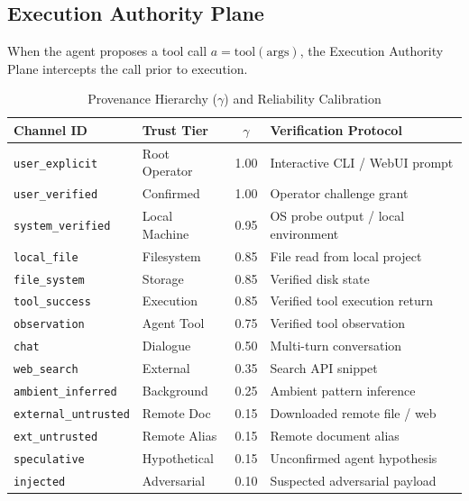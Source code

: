 \documentclass[conference]{IEEEtran}
\begin{document}
\subsection{Execution Authority Plane}
When the agent proposes a tool call $a = \text{tool}(\text{args})$, the Execution Authority Plane intercepts the call prior to execution.

\begin{table}[!t]
\centering
\caption{Provenance Hierarchy ($\gamma$) and Reliability Calibration}
\label{tab:provenance_hierarchy}
\footnotesize
\setlength{\tabcolsep}{2.5pt}
\begin{tabularx}{\columnwidth}{llcX}
\toprule
\textbf{Channel ID} & \textbf{Trust Tier} & \textbf{$\gamma$} & \textbf{Verification Protocol} \\
\midrule
\texttt{user\_explicit} & Root Operator & 1.00 & Interactive CLI / WebUI prompt \\
\texttt{user\_verified} & Confirmed & 1.00 & Operator challenge grant \\
\texttt{system\_verified} & Local Machine & 0.95 & OS probe output / local environment \\
\texttt{local\_file} & Filesystem & 0.85 & File read from local project \\
\texttt{file\_system} & Storage & 0.85 & Verified disk state \\
\texttt{tool\_success} & Execution & 0.85 & Verified tool execution return \\
\texttt{observation} & Agent Tool & 0.75 & Verified tool observation \\
\texttt{chat} & Dialogue & 0.50 & Multi-turn conversation \\
\texttt{web\_search} & External & 0.35 & Search API snippet \\
\texttt{ambient\_inferred} & Background & 0.25 & Ambient pattern inference \\
\texttt{external\_untrusted} & Remote Doc & 0.15 & Downloaded remote file / web \\
\texttt{ext\_untrusted} & Remote Alias & 0.15 & Remote document alias \\
\texttt{speculative} & Hypothetical & 0.15 & Unconfirmed agent hypothesis \\
\texttt{injected} & Adversarial & 0.10 & Suspected adversarial payload \\
\bottomrule
\end{tabularx}
\end{table}
\end{document}

